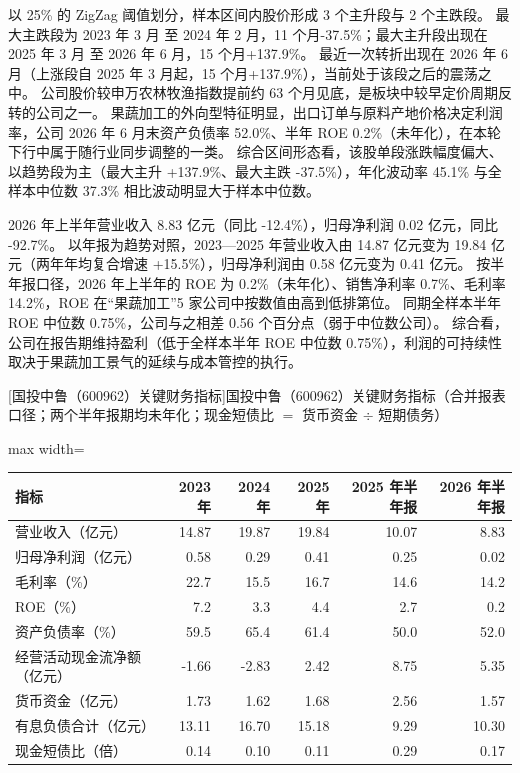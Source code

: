  以 25\% 的 ZigZag 阈值划分，样本区间内股价形成 3 个主升段与 2 个主跌段。 最大主跌段为 2023 年 3 月 至 2024 年 2 月，11 个月-37.5\%；最大主升段出现在 2025 年 3 月 至 2026 年 6 月，15 个月+137.9\%。 最近一次转折出现在 2026 年 6 月（上涨段自 2025 年 3 月起，15 个月+137.9\%），当前处于该段之后的震荡之中。 公司股价较申万农林牧渔指数提前约 63 个月见底，是板块中较早定价周期反转的公司之一。 果蔬加工的外向型特征明显，出口订单与原料产地价格决定利润率，公司 2026 年 6 月末资产负债率 52.0\%、半年 ROE 0.2\%（未年化），在本轮下行中属于随行业同步调整的一类。 综合区间形态看，该股单段涨跌幅度偏大、以趋势段为主（最大主升 +137.9\%、最大主跌 -37.5\%），年化波动率 45.1\% 与全样本中位数 37.3\% 相比波动明显大于样本中位数。

 2026 年上半年营业收入 8.83 亿元（同比 -12.4\%），归母净利润 0.02 亿元，同比 -92.7\%。 以年报为趋势对照，2023---2025 年营业收入由 14.87 亿元变为 19.84 亿元（两年年均复合增速 +15.5\%），归母净利润由 0.58 亿元变为 0.41 亿元。 按半年报口径，2026 年上半年的 ROE 为 0.2\%（未年化）、销售净利率 0.7\%、毛利率 14.2\%，ROE 在“果蔬加工”5 家公司中按数值由高到低排第位。 同期全样本半年 ROE 中位数 0.75\%，公司与之相差 0.56 个百分点（弱于中位数公司）。 综合看，公司在报告期维持盈利（低于全样本半年 ROE 中位数 0.75\%），利润的可持续性取决于果蔬加工景气的延续与成本管控的执行。

\begin{center}\small\setlength{\tabcolsep}{3.4pt}
[国投中鲁（600962）关键财务指标]{国投中鲁（600962）关键财务指标（合并报表口径；两个半年报期均未年化；现金短债比 $=$ 货币资金 $\div$ 短期债务）}
\begin{adjustbox}{max width=\textwidth}
\begin{tabular}{@{}lrrrrr@{}}
\toprule
指标 & 2023 年 & 2024 年 & 2025 年 & 2025 年半年报 & 2026 年半年报 \\
\midrule
营业收入（亿元） & 14.87 & 19.87 & 19.84 & 10.07 & 8.83 \\
归母净利润（亿元） & 0.58 & 0.29 & 0.41 & 0.25 & 0.02 \\
毛利率（\%） & 22.7 & 15.5 & 16.7 & 14.6 & 14.2 \\
ROE（\%） & 7.2 & 3.3 & 4.4 & 2.7 & 0.2 \\
资产负债率（\%） & 59.5 & 65.4 & 61.4 & 50.0 & 52.0 \\
经营活动现金流净额（亿元） & -1.66 & -2.83 & 2.42 & 8.75 & 5.35 \\
货币资金（亿元） & 1.73 & 1.62 & 1.68 & 2.56 & 1.57 \\
有息负债合计（亿元） & 13.11 & 16.70 & 15.18 & 9.29 & 10.30 \\
现金短债比（倍） & 0.14 & 0.10 & 0.11 & 0.29 & 0.17 \\
\bottomrule
\end{tabular}
\end{adjustbox}
\end{center}


